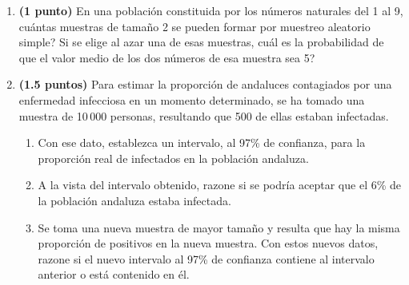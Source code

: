 
\begin{enumerate}[label=\alph*)]
  \item \textbf{(1 punto)} En una población constituida por los números
  naturales del 1 al 9, \textquestiondown{}cuántas muestras de tamaño 2 se
  pueden formar por muestreo aleatorio simple? Si se elige al azar una de esas
  muestras, \textquestiondown{}cuál es la probabilidad de que el valor medio
  de los dos números de esa muestra sea 5?
  \item \textbf{(1.5 puntos)} Para estimar la proporción de andaluces contagiados
  por una enfermedad infecciosa en un momento determinado, se ha tomado una
  muestra de 10\,000 personas, resultando que 500 de ellas estaban infectadas.
  \begin{enumerate}[label=\arabic*.]
    \item Con ese dato, establezca un intervalo, al 97\% de confianza, para
    la proporción real de infectados en la población andaluza.
    \item A la vista del intervalo obtenido, razone si se podría aceptar que
    el 6\% de la población andaluza estaba infectada.
    \item Se toma una nueva muestra de mayor tamaño y resulta que hay la
    misma proporción de positivos en la nueva muestra. Con estos nuevos datos,
    razone si el nuevo intervalo al 97\% de confianza contiene al intervalo
    anterior o está contenido en él.
  \end{enumerate}
\end{enumerate}
